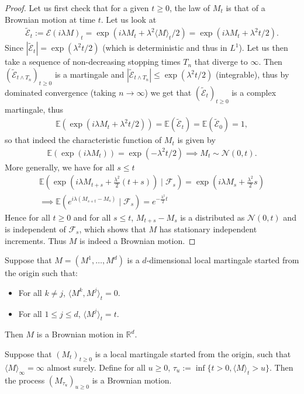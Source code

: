 \documentclass[../mainfile.tex]{subfiles}
\begin{document}
\begin{proof}
Let us first check that for a given $t \geq 0$, the law of $M_t$ is that of a Brownian motion at time $t$. Let us look at 
\begin{align*}
\tilde{\mathcal{E}}_t := \mathcal{E}(i \lambda M )_t= \exp(i \lambda M_t + \lambda^2 \langle M \rangle_t/2) = \exp(i \lambda M_t + \lambda^2 t/2).
\end{align*}
Since $| \tilde{\mathcal{E}}_t| = \exp( \lambda^2 t/2)$ (which is deterministic and thus in $L^1$). Let us then take a sequence of non-decreasing stopping times $T_n$ that diverge to $\infty$. Then $( \tilde{\mathcal{E}}_{t \wedge T_n})_{t \geq 0}$ is a martingale and $|\tilde{\mathcal{E}}_{t \wedge T_n}| \leq \exp (\lambda^2 t/2)$ (integrable), thus by dominated convergence (taking $n \to \infty$) we get that $(\tilde{\mathcal{E}}_t)_{t \geq 0}$ is a complex martingale, thus
\begin{align*}
\mathbb{E}(\exp(i \lambda M_t + \lambda^2 t/2))= \mathbb{E}( \tilde{\mathcal{E}}_t)= \mathbb{E}( \tilde{\mathcal{E}}_0)=1,
\end{align*}
so that indeed the characteristic function of $M_t$ is given by 
\begin{align*}
\mathbb{E}( \exp(i \lambda M_t))= \exp( - \lambda^2 t/2) \implies M_t \sim \mathcal{N}(0,t). 
\end{align*}
More generally, we have for all $s \leq t$ 
\begin{align*}
\mathbb{E}( \exp(i \lambda M_{t+s}+ \frac{\lambda^2}{2}(t+s)) \mid \mathcal{F}_s) = \exp(i \lambda M_s + \frac{\lambda^2}{2}s)  \\
\implies \mathbb{E}(e^{i \lambda (M_{s+t}-M_s)} \mid \mathcal{F}_s) = e^{- \frac{\lambda^2}{2}t}
\end{align*}
Hence for all $t\geq 0$ and for all $s \leq t$, $M_{t+s}-M_s$ is a distributed as $\mathcal{N}(0,t)$ and is independent of $\mathcal{F}_s$, which shows that $M$ has stationary independent increments. Thus $M$ is indeed a Brownian motion. 
\end{proof}
\begin{cor} Suppose that $M=(M^1, \dots , M^d)$ is a $d$-dimensional local martingale started from the origin such that:
\begin{itemize}
\item For all $k \neq j$, $\langle M^k, M^j \rangle_t=0$. 
\item For all $1 \leq j \leq d$, $\langle M^j \rangle_t =t$. 
\end{itemize}
Then $M$ is a Brownian motion in $\mathbb{R}^d$. 
\end{cor}
\begin{cor} Suppose that $(M_t)_{t \geq 0}$ is a local martingale started from the origin, such that $\langle M \rangle_\infty = \infty$ almost surely. Define for all $u \geq 0$, $\tau_u:= \inf \{ t >0 , \langle M \rangle_t > u \}$. Then the process $(M_{\tau_u})_{u \geq 0}$ is a Brownian motion. 
\end{cor}
\newpage
\end{document}
